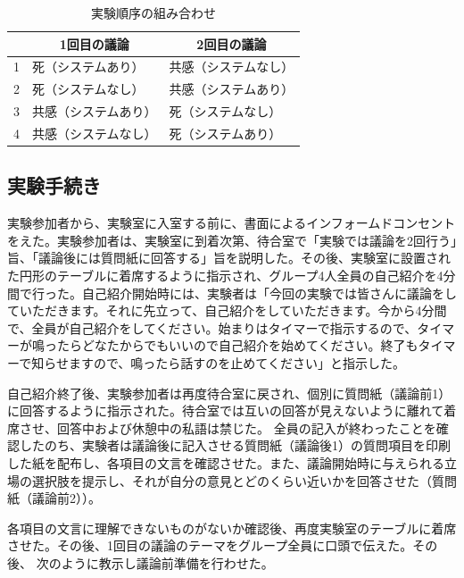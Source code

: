 \documentclass[11pt, a4paper]{jreport} %
\begin{document}
\begin{table}[]
\caption{実験順序の組み合わせ}
\centering
\label{tab:順序}
\begin{tabular}{@{}lll@{}}
\toprule
  & \multicolumn{1}{c}{1回目の議論} & \multicolumn{1}{c}{2回目の議論} \\ \midrule
1 & 死（システムあり）                  & 共感（システムなし）                 \\
2 & 死（システムなし）                  & 共感（システムあり）                 \\
3 & 共感（システムあり）                 & 死（システムなし）                  \\
4 & 共感（システムなし）                 & 死（システムあり）                  \\ \bottomrule
\end{tabular}
\end{table}


\subsection{実験手続き}
実験参加者から、実験室に入室する前に、書面によるインフォームドコンセントをえた。実験参加者は、実験室に到着次第、待合室で「実験では議論を2回行う」旨、「議論後には質問紙に回答する」旨を説明した。その後、実験室に設置された円形のテーブルに着席するように指示され、グループ4人全員の自己紹介を4分間で行った。自己紹介開始時には、実験者は「今回の実験では皆さんに議論をしていただきます。それに先立って、自己紹介をしていただきます。今から4分間で、全員が自己紹介をしてください。始まりはタイマーで指示するので、タイマーが鳴ったらどなたからでもいいので自己紹介を始めてください。終了もタイマーで知らせますので、鳴ったら話すのを止めてください」と指示した。


自己紹介終了後、実験参加者は再度待合室に戻され、個別に質問紙（議論前1）に回答するように指示された。待合室では互いの回答が見えないように離れて着席させ、回答中および休憩中の私語は禁じた。
全員の記入が終わったことを確認したのち、実験者は議論後に記入させる質問紙（議論後1）の質問項目を印刷した紙を配布し、各項目の文言を確認させた。また、議論開始時に与えられる立場の選択肢を提示し、それが自分の意見とどのくらい近いかを回答させた（質問紙（議論前2））。

各項目の文言に理解できないものがないか確認後、再度実験室のテーブルに着席させた。その後、1回目の議論のテーマをグループ全員に口頭で伝えた。その後、
次のように教示し議論前準備を行わせた。
\end{document}
